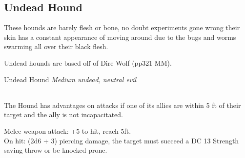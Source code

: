 \documentclass[10pt,twoside,twocolumn]{article}
\begin{document}
\subsection{Undead Hound}

\begin{quotebox}
These hounds are barely flesh or bone, no doubt experiments gone wrong their skin has a constant appearance of moving around due to the bugs and worms swarming all over their black flesh.
\end{quotebox}

Undead hounds are based off of Dire Wolf (pp321 MM).

\begin{monsterbox}{Undead Hound}
	\textit{Medium undead, neutral evil}\\
	\hline
	\basics[%
	armorclass = 14,
	hitpoints  = 37 (5d10+10),
	speed      = 50 ft
	]
	\hline
	\stats[
	STR = 17 (+3),
	DEX = 15 (+2),
	CON = 15 (+2),
	INT = 3 (-4),
	WIS = 12 (+1),
	CHA = 7 (-2)
	]
	\hline
	\details[%
	languages = {None},
	]
	\hline \\[1mm]
	\begin{monsteraction}
		The Hound has advantages on attacks if one of its allies are within 5 ft of their target and the ally is not incapacitated.
	\end{monsteraction}
	\begin{monsteraction}[Rush.]
		Melee weapon attack: +5 to hit, reach 5ft. \\
		
		On hit: (2d6 + 3) piercing damage, the target must succeed a DC 13 Strength saving throw or be knocked prone.
	\end{monsteraction}
\end{monsterbox}
\end{document}
